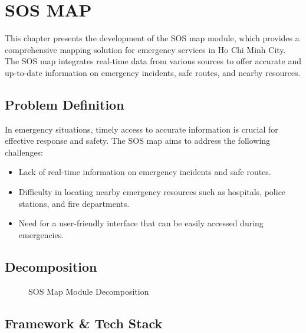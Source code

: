 \chapter{SOS MAP}
\label{chap:sos-map}
This chapter presents the development of the SOS map module, which provides a comprehensive mapping solution for emergency services in Ho Chi Minh City. The SOS map integrates real-time data from various sources to offer accurate and up-to-date information on emergency incidents, safe routes, and nearby resources.

\section{Problem Definition}
In emergency situations, timely access to accurate information is crucial for effective response and safety. The SOS map aims to address the following challenges:
\begin{itemize}
    \item Lack of real-time information on emergency incidents and safe routes.
    \item Difficulty in locating nearby emergency resources such as hospitals, police stations, and fire departments.
    \item Need for a user-friendly interface that can be easily accessed during emergencies.
\end{itemize}

\section{Decomposition}

\begin{figure}[H] 
    \centering
    \caption{SOS Map Module Decomposition}
    \label{fig:sosmap-overview}
\end{figure}

\section{Framework \& Tech Stack}